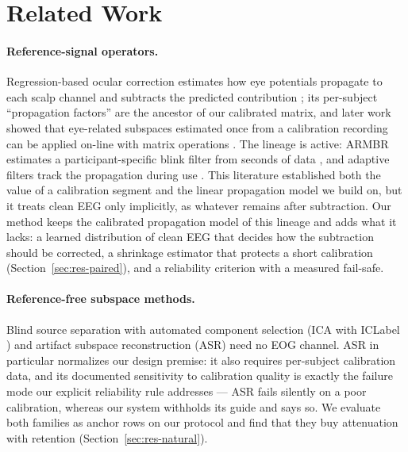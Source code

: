 \section{Related Work}
\label{sec:related-work}

\paragraph{Reference-signal operators.}
Regression-based ocular correction estimates how eye potentials propagate to each scalp channel and subtracts the predicted contribution \cite{gratton1983ocular,semlitsch1986ocular,schlogl2007regression}; its per-subject ``propagation factors'' are the ancestor of our calibrated matrix, and later work showed that eye-related subspaces estimated once from a calibration recording can be applied on-line with matrix operations \cite{kobler2020sgeyesub}. The lineage is active: ARMBR estimates a participant-specific blink filter from seconds of data \cite{alkhoury2025armbr}, and adaptive filters track the propagation during use \cite{he2004rls}. This literature established both the value of a calibration segment and the linear propagation model we build on, but it treats clean EEG only implicitly, as whatever remains after subtraction. Our method keeps the calibrated propagation model of this lineage and adds what it lacks: a learned distribution of clean EEG that decides how the subtraction should be corrected, a shrinkage estimator that protects a short calibration (Section~\ref{sec:res-paired}), and a reliability criterion with a measured fail-safe.

\paragraph{Reference-free subspace methods.}
Blind source separation with automated component selection (ICA with ICLabel \cite{jung2000bss,pion2019iclabel}) and artifact subspace reconstruction (ASR) \cite{mullen2015asr,chang2020asr} need no EOG channel. ASR in particular normalizes our design premise: it also requires per-subject calibration data, and its documented sensitivity to calibration quality is exactly the failure mode our explicit reliability rule addresses --- ASR fails silently on a poor calibration, whereas our system withholds its guide and says so. We evaluate both families as anchor rows on our protocol and find that they buy attenuation with retention (Section~\ref{sec:res-natural}).

